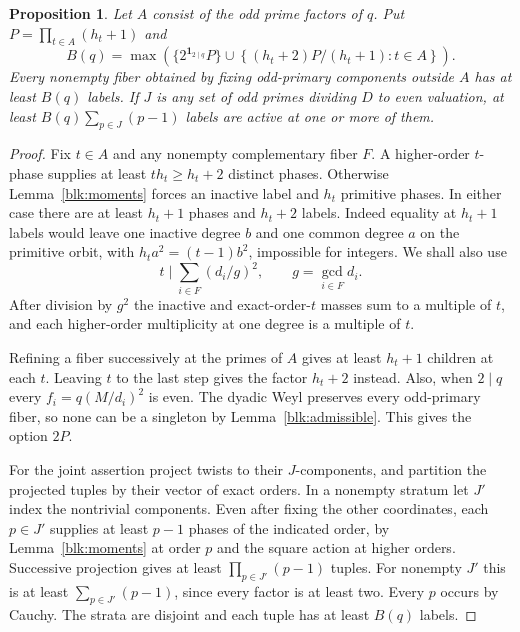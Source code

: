 \documentclass[11pt]{amsart}
\numberwithin{equation}{section}
\newtheorem{proposition}[theorem]{Proposition}
\begin{document}
\begin{proposition}\label{blk:packets}
Let $A$ consist of the odd prime factors of $q$. Put $P=\prod_{t\in A}(h_t+1)$ and
\[
 B(q)=\max\left(\{2^{\mathbf1_{2\mid q}}P\}\cup
 \left\{(h_t+2)P/(h_t+1):t\in A\right\}\right).
\]
Every nonempty fiber obtained by fixing odd-primary components outside $A$ has at least $B(q)$ labels. If $J$ is any set of odd primes dividing $D$ to even valuation, at least $B(q)\sum_{p\in J}(p-1)$ labels are active at one or more of them.
\end{proposition}
\begin{proof}
Fix $t\in A$ and any nonempty complementary fiber $F$. A higher-order $t$-phase supplies at least $th_t\ge h_t+2$ distinct phases. Otherwise Lemma~\ref{blk:moments} forces an inactive label and $h_t$ primitive phases. In either case there are at least $h_t+1$ phases and $h_t+2$ labels. Indeed equality at $h_t+1$ labels would leave one inactive degree $b$ and one common degree $a$ on the primitive orbit, with $h_ta^2=(t-1)b^2$, impossible for integers. We shall also use
\begin{equation}\label{blk:fibergcd}
 t\mid \sum_{i\in F}(d_i/g)^2,\qquad g=\gcd_{i\in F}d_i.
\end{equation}
After division by $g^2$ the inactive and exact-order-$t$ masses sum to a multiple of $t$, and each higher-order multiplicity at one degree is a multiple of $t$.

Refining a fiber successively at the primes of $A$ gives at least $h_t+1$ children at each $t$. Leaving $t$ to the last step gives the factor $h_t+2$ instead. Also, when $2\mid q$ every $f_i=q(M/d_i)^2$ is even. The dyadic Weyl preserves every odd-primary fiber, so none can be a singleton by Lemma~\ref{blk:admissible}. This gives the option $2P$.

For the joint assertion project twists to their $J$-components, and partition the projected tuples by their vector of exact orders. In a nonempty stratum let $J'$ index the nontrivial components. Even after fixing the other coordinates, each $p\in J'$ supplies at least $p-1$ phases of the indicated order, by Lemma~\ref{blk:moments} at order $p$ and the square action at higher orders. Successive projection gives at least $\prod_{p\in J'}(p-1)$ tuples. For nonempty $J'$ this is at least $\sum_{p\in J'}(p-1)$, since every factor is at least two. Every $p$ occurs by Cauchy. The strata are disjoint and each tuple has at least $B(q)$ labels.
\end{proof}
\end{document}
